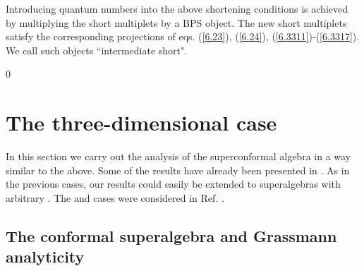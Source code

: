 \documentclass[a4paper,12pt]{article}
\begin{document}
Introducing \coordHE{} quantum numbers into the above 
shortening conditions is achieved by multiplying the short 
multiplets by a BPS object. The new short multiplets satisfy the 
corresponding \coordHE{} projections of eqs. (\ref{6.23}), 
(\ref{6.24}), (\ref{6.3311})-(\ref{6.3317}). We call such objects 
``intermediate short".
 






\setcounter{equation}0 
\section{The three-dimensional case}


In this section we carry out the analysis of the \coordHE{}  \coordHE{} 
superconformal algebra \coordHE{} in a way 
similar to the above. Some of the results have already been 
presented in \cite{FS2}. As in the previous cases, our results 
could easily be extended to \coordHE{} 
superalgebras with arbitrary \coordHE{}. The \coordHE{} and \coordHE{} cases were 
considered in Ref. \cite{Torino}.

\subsection{The conformal superalgebra \coordHE{} 
and Grassmann analyticity}\label{CSGA} 
\end{document}
